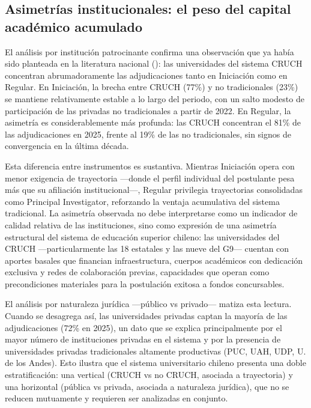 \documentclass[
  spanish,
  a4paper,
  oneside]{scrbook}
\begin{document}
\subsection{Asimetrías institucionales: el peso del capital académico
acumulado}\label{asimetruxedas-institucionales-el-peso-del-capital-acaduxe9mico-acumulado}

El análisis por institución patrocinante confirma una observación que ya
había sido planteada en la literatura nacional
(): las
universidades del sistema CRUCH concentran abrumadoramente las
adjudicaciones tanto en Iniciación como en Regular. En Iniciación, la
brecha entre CRUCH (77\%) y no tradicionales (23\%) se mantiene
relativamente estable a lo largo del periodo, con un salto modesto de
participación de las privadas no tradicionales a partir de 2022. En
Regular, la asimetría es considerablemente más profunda: las CRUCH
concentran el 81\% de las adjudicaciones en 2025, frente al 19\% de las
no tradicionales, sin signos de convergencia en la última década.

Esta diferencia entre instrumentos es sustantiva. Mientras Iniciación
opera con menor exigencia de trayectoria ---donde el perfil individual
del postulante pesa más que su afiliación institucional---, Regular
privilegia trayectorias consolidadas como Principal Investigator,
reforzando la ventaja acumulativa del sistema tradicional. La asimetría
observada no debe interpretarse como un indicador de calidad relativa de
las instituciones, sino como expresión de una asimetría estructural del
sistema de educación superior chileno: las universidades del CRUCH
---particularmente las 18 estatales y las nueve del G9--- cuentan con
aportes basales que financian infraestructura, cuerpos académicos con
dedicación exclusiva y redes de colaboración previas, capacidades que
operan como precondiciones materiales para la postulación exitosa a
fondos concursables.

El análisis por naturaleza jurídica ---público vs privado--- matiza esta
lectura. Cuando se desagrega así, las universidades privadas captan la
mayoría de las adjudicaciones (72\% en 2025), un dato que se explica
principalmente por el mayor número de instituciones privadas en el
sistema y por la presencia de universidades privadas tradicionales
altamente productivas (PUC, UAH, UDP, U. de los Andes). Esto ilustra que
el sistema universitario chileno presenta una doble estratificación: una
vertical (CRUCH vs no CRUCH, asociada a trayectoria) y una horizontal
(pública vs privada, asociada a naturaleza jurídica), que no se reducen
mutuamente y requieren ser analizadas en conjunto.
\end{document}
